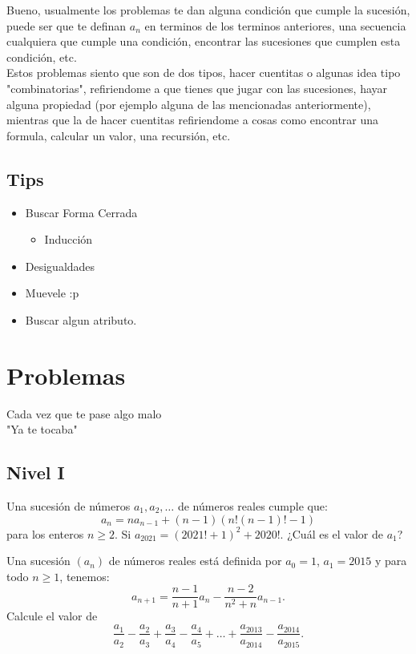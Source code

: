 \documentclass[11pt]{scrartcl}
\newcommand{\thmdifficulty}{0}
\newcommand{\problemdiff}[1]{\renewcommand{\thmdifficulty}{#1}}
\begin{document}
Bueno, usualmente los problemas te dan alguna condici\'on que cumple la sucesi\'on, puede ser
que te definan $a_n$ en terminos de los terminos anteriores, una secuencia cualquiera que cumple una condici\'on,
encontrar las sucesiones que cumplen esta condici\'on, etc. \\

Estos problemas siento que son de dos tipos, hacer cuentitas o algunas idea tipo "combinatorias", refiriendome a que tienes que 
jugar con las sucesiones, hayar alguna propiedad (por ejemplo alguna de las mencionadas anteriormente), mientras que la de hacer cuentitas 
refiriendome a cosas como encontrar una formula, calcular un valor, una recursi\'on, etc. 


\subsection{Tips}
\begin{itemize}
    \item Buscar Forma Cerrada \begin{itemize}
        \item Inducción
    \end{itemize}
    \item Desigualdades
    \item Muevele :p 
    \item Buscar algun atributo.
\end{itemize}

\newpage 
\section{Problemas}
\epigraph{Cada vez que te pase algo malo \\
"Ya te tocaba"}{}

\subsection{Nivel I}

\problemdiff{2}
\begin{problem}
Una sucesión de números $a_1, a_2, \ldots$ de números reales cumple que: 
\[a_n = na_{n-1}+(n-1)(n!(n-1)!-1)\]
para los enteros $n \geq 2$. Si $a_{2021}=(2021!+1)^2+2020!$. ¿Cuál es el valor de $a_1$?
\end{problem}

\problemdiff{3}
\begin{problem}

    Una sucesión $(a_n)$ de números reales está definida por $a_0=1$, $a_1=2015$ y para todo $n\geq1$, tenemos:
\[a_{n+1}=\frac{n-1}{n+1}a_n-\frac{n-2}{n^2+n}a_{n-1}. \]
Calcule el valor de
 $$\frac{a_1}{a_2}-\frac{a_2}{a_3}+\frac{a_3}{a_4}-\frac{a_4}{a_5}+\ldots+\frac{a_{2013}}{a_{2014}}-\frac{a_{2014}}{a_{2015}}.$$
\end{problem}
\end{document}
